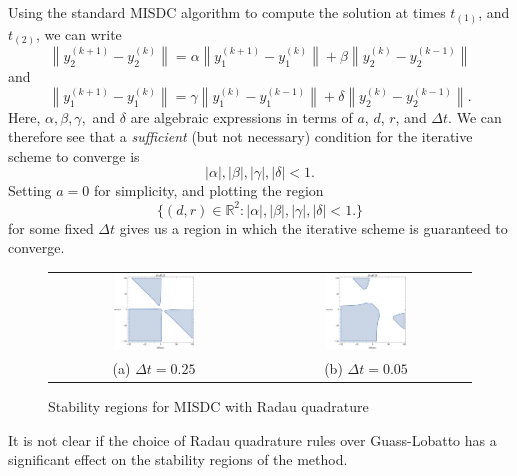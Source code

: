 \documentclass[12pt]{article}
\begin{document}
Using the standard MISDC algorithm to compute the solution at times $t_{(1)}$, 
and $t_{(2)}$, we can write
\[
    \left\| y^{(k+1)}_2 - y^{(k)}_2 \right\| = 
        \alpha \left\| y^{(k+1)}_1 - y^{(k)}_1 \right\|
      + \beta  \left\| y^{(k)}_2 - y^{(k-1)}_2 \right\|
\]
and
\[
\left\| y^{(k+1)}_1 - y^{(k)}_1 \right\| = 
        \gamma \left\| y^{(k)}_1 - y^{(k-1)}_1 \right\|
      + \delta \left\| y^{(k)}_2 - y^{(k-1)}_2 \right\|.
\]
Here, $\alpha, \beta, \gamma,$ and $\delta$ are algebraic expressions in terms 
of $a$, $d$, $r$, and $\Delta t$.
We can therefore see that a \textit{sufficient} (but not necessary) condition 
for the iterative scheme to converge is
\[
    |\alpha|, |\beta|, |\gamma|, |\delta| < 1.
\]
Setting $a = 0$ for simplicity, and plotting the region
\[
    \{ (d, r) \in \mathbb{R}^2 : |\alpha|, |\beta|, |\gamma|, |\delta| < 1. \}
\]
for some fixed $\Delta t$ gives us a region in which the iterative scheme 
is guaranteed to converge.
\begin{figure}[H]
\begin{tabular}{cc}
  \includegraphics[width=0.4\textwidth]{radau1} &   \includegraphics[width=0.4\textwidth]{radau2} \\
(a) $\Delta t = 0.25$ & (b) $\Delta t = 0.05$ \\[6pt]
\end{tabular}
\caption{Stability regions for MISDC with Radau quadrature}
\end{figure}
It is not clear if the choice of Radau quadrature rules over Guass-Lobatto has 
a significant effect on the stability regions of the method.
\end{document}
